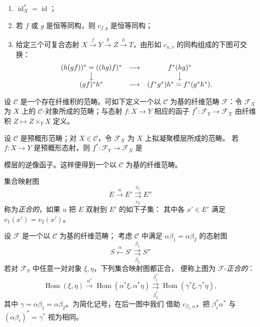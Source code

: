 \begin{enumerate}
\item[(i)] $\operatorname{id}_X^*=\operatorname{id}$；
\item[(ii)] 若 $f$ 或 $g$ 是恒等同构，则 $c_{f,g}$ 是恒等同构；
\item[(iii)] 给定三个可复合态射
$X\xrightarrow{f}Y\xrightarrow{g}Z\xrightarrow{h}T$，由形如
$c_{u,v}$ 的同构组成的下图可交换：
\[
\begin{array}{ccc}
  (h(gf))^*=((hg)f)^* & \longrightarrow & f^*(hg)^* \\
  \big\downarrow && \big\downarrow \\
  (gf)^*h^* & \longrightarrow & (f^*g^*)h^*=f^*(g^*h^*).
\end{array}
\]
\end{enumerate}

 设 $\mathcal C$ 是一个存在纤维积的范畴。可如下定义一个以
$\mathcal C$ 为基的纤维范畴 $\mathcal F$：令 $\mathcal F_X$ 为
$X$ 上的 $\mathcal C$-对象所成的范畴；与态射
$f:X\longrightarrow Y$ 相应的函子
$f^*:\mathcal F_Y\longrightarrow\mathcal F_X$ 由纤维积
$Z\longmapsto Z\times_YX$ 定义。

 设 $\mathcal C$ 是预概形范畴；对
$X\in\mathcal C$，令 $\mathcal F_X$ 为 $X$ 上拟凝聚模层所成的范畴。
若 $f:X\longrightarrow Y$ 是预概形态射，则
$f^*:\mathcal F_Y\longrightarrow\mathcal F_X$ 是

模层的逆像函子。这样便得到一个以 $\mathcal C$ 为基的纤维范畴。

 集合映射图
\[
  E\xrightarrow{u}E'
  \overset{v_1}{\underset{v_2}{\rightrightarrows}}E''
\]
称为\emph{正合的}，如果 $u$ 把 $E$ 双射到 $E'$ 的如下子集：
其中各 $x'\in E'$ 满足 $v_1(x')=v_2(x')$。

 设 $\mathcal F$ 是一个以 $\mathcal C$ 为基的纤维范畴；
考虑 $\mathcal C$ 中满足 $\alpha\beta_1=\alpha\beta_2$ 的态射图
\[
  \tag{+}
  S\xleftarrow{\alpha}S'
  \overset{\beta_1}{\underset{\beta_2}{\rightrightarrows}}S''
\]
若对 $\mathcal F_S$ 中任意一对对象 $\xi,\eta$，下列集合映射图都正合，
便称上图为 $\mathcal F$-\emph{正合的}：
\[
  \tag{+'}
  \operatorname{Hom}(\xi,\eta)
  \xrightarrow{\alpha^*}
  \operatorname{Hom}(\alpha^*\xi,\alpha^*\eta)
  \overset{\beta_1^*}{\underset{\beta_2^*}{\rightrightarrows}}
  \operatorname{Hom}(\gamma^*\xi,\gamma^*\eta),
\]
其中 $\gamma=\alpha\beta_1=\alpha\beta_2$。为简化记号，在后一图中我们
借助 $c_{\beta_i,\alpha}$，把 $\beta_i^*\alpha^*$ 与
$(\alpha\beta_i)^*=\gamma^*$ 视为相同。

